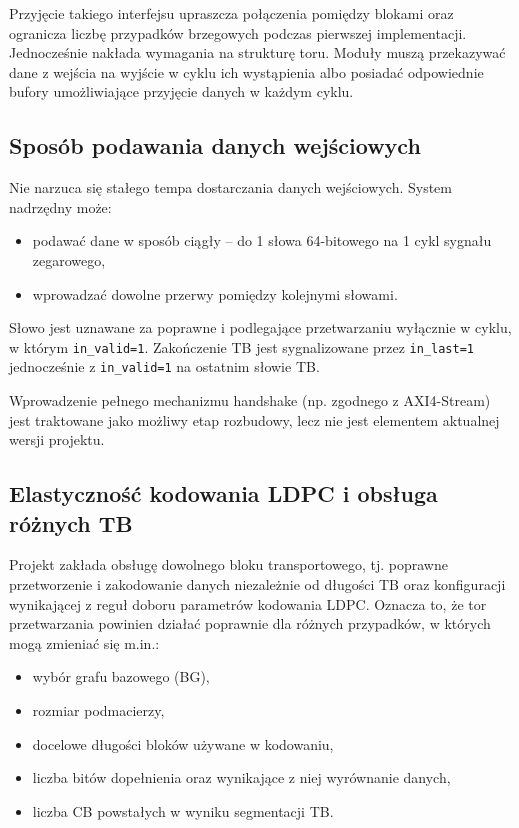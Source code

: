 Przyjęcie takiego interfejsu upraszcza połączenia pomiędzy blokami oraz ogranicza liczbę przypadków brzegowych podczas pierwszej implementacji. Jednocześnie nakłada wymagania na strukturę toru. Moduły muszą przekazywać dane z wejścia na wyjście w cyklu ich wystąpienia albo posiadać odpowiednie bufory umożliwiające przyjęcie danych w każdym cyklu.


\subsection{Sposób podawania danych wejściowych}
Nie narzuca się stałego tempa dostarczania danych wejściowych. System nadrzędny może:
\begin{itemize}
    \item podawać dane w sposób ciągły -- do 1 słowa 64-bitowego na 1 cykl sygnału zegarowego,
    \item wprowadzać dowolne przerwy pomiędzy kolejnymi słowami.
\end{itemize}

Słowo jest uznawane za poprawne i podlegające przetwarzaniu wyłącznie w cyklu, w którym \texttt{in\_valid=1}. Zakończenie TB jest sygnalizowane przez \texttt{in\_last=1} jednocześnie z \texttt{in\_valid=1} na ostatnim słowie TB.

Wprowadzenie pełnego mechanizmu handshake (np. zgodnego z AXI4-Stream) jest traktowane jako możliwy etap rozbudowy, lecz nie jest elementem aktualnej wersji projektu.

\subsection{Elastyczność kodowania LDPC i obsługa różnych TB}
Projekt zakłada obsługę dowolnego bloku transportowego, tj. poprawne przetworzenie i zakodowanie danych niezależnie od długości TB oraz konfiguracji wynikającej z reguł doboru parametrów kodowania LDPC. Oznacza to, że tor przetwarzania powinien działać poprawnie dla różnych przypadków, w których mogą zmieniać się m.in.:
\begin{itemize}
    \item wybór grafu bazowego (BG),
    \item rozmiar podmacierzy,
    \item docelowe długości bloków używane w kodowaniu,
    \item liczba bitów dopełnienia oraz wynikające z niej wyrównanie danych,
    \item liczba CB powstałych w wyniku segmentacji TB.
\end{itemize}

